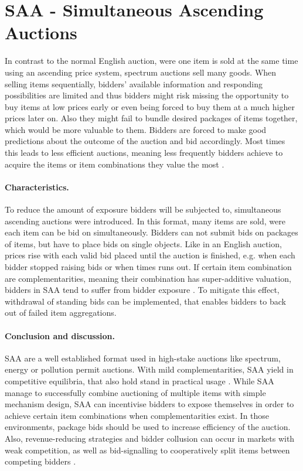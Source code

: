 \section{SAA - Simultaneous Ascending Auctions}
In contrast to the normal English auction, were one item is sold at the same time using an ascending price system, spectrum auctions sell many goods. When selling items sequentially, bidders' available information and responding possibilities are limited and thus bidders might risk missing the opportunity to buy items at low prices early or even being forced to buy them at a much higher prices later on. Also they might fail to bundle desired packages of items together, which would be more valuable to them. Bidders are forced to make good predictions about the outcome of the auction and bid accordingly. Most times this leads to less efficient auctions, meaning less frequently bidders achieve to acquire the items or item combinations they value the most \cite[p. 185]{Cramton2006}.

\paragraph{Characteristics.}
To reduce the amount of exposure bidders will be subjected to, simultaneous ascending auctions were introduced. In this format, many items are sold, were each item can be bid on simultaneously. Bidders can not submit bids on packages of items, but have to place bids on single objects. Like in an English auction, prices rise with each valid bid placed until the auction is finished, e.g. when each bidder stopped raising bids or when times runs out. 
If certain item combination are complementarities, meaning their combination has super-additive valuation, bidders in SAA tend to suffer from bidder exposure \cite[p. 209]{Cramton2006}. To mitigate this effect, withdrawal of standing bids can be implemented, that enables bidders to back out of failed item aggregations.

\paragraph{Conclusion and discussion.}
SAA are a well established format used in high-stake auctions like spectrum, energy or pollution permit auctions. With mild complementarities, SAA yield in competitive equilibria, that also hold stand in practical usage \cite[p. 209]{Cramton2006}. While SAA manage to successfully combine auctioning of multiple items with simple mechanism design, SAA can incentivise bidders to expose themselves in order to achieve certain item combinations when complementarities exist. In those environments, package bids should be used to increase efficiency of the auction\cite[p. 185]{Cramton2006}. Also, revenue-reducing strategies and bidder collusion can occur in markets with weak competition, as well as bid-signalling to cooperatively split items between competing bidders \cite[p. 187., p. 209]{Cramton2006}.


